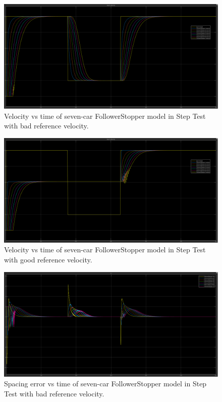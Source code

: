 \documentclass[conference]{IEEEtran}
\begin{document}
\begin{appendix}
\begin{figure}[htbp]
\centerline{\includegraphics[width=6.50 in]{multiFS_velbad.png}}
\caption{Velocity vs time of seven-car FollowerStopper model in Step Test with bad reference velocity.}
\label{stringvelbad}
\end{figure}

\begin{figure}[htbp]
\centerline{\includegraphics[width=6.50 in]{multiFS_velgood.png}}
\caption{Velocity vs time of seven-car FollowerStopper model in Step Test with good reference velocity.}
\label{stringvelgood}
\end{figure}

\begin{figure}[htbp]
\centerline{\includegraphics[width=6.50 in]{multiFS_errorbad.png}}
\caption{Spacing error vs time of seven-car FollowerStopper model in Step Test with bad reference velocity.}
\label{stringerrorbad}
\end{figure}


\end{appendix}
\end{document}
